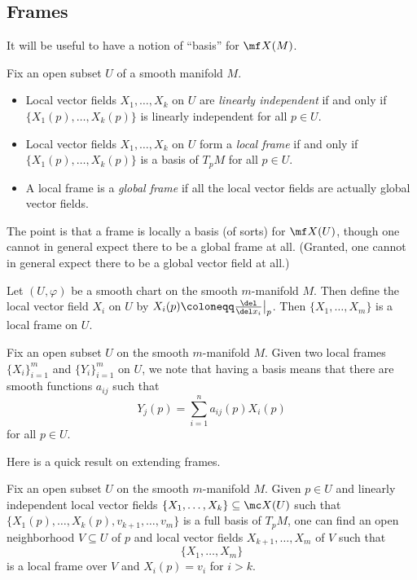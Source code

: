 \documentclass[../notes.tex]{subfiles}
\begin{document}
\subsection{Frames}
It will be useful to have a notion of ``basis'' for $\mf X(M)$.
\begin{definition}[frame]
	Fix an open subset $U$ of a smooth manifold $M$.
	\begin{itemize}
		\item Local vector fields $X_1,\ldots,X_k$ on $U$ are \textit{linearly independent} if and only if $\{X_1(p),\ldots,X_k(p)\}$ is linearly independent for all $p\in U$.
		\item Local vector fields $X_1,\ldots,X_k$ on $U$ form a \textit{local frame} if and only if $\{X_1(p),\ldots,X_k(p)\}$ is a basis of $T_pM$ for all $p\in U$.
		\item A local frame is a \textit{global frame} if all the local vector fields are actually global vector fields.
	\end{itemize}
\end{definition}
The point is that a frame is locally a basis (of sorts) for $\mf X(U)$, though one cannot in general expect there to be a global frame at all. (Granted, one cannot in general expect there to be a global vector field at all.)
\begin{example}
	Let $(U,\varphi)$ be a smooth chart on the smooth $m$-manifold $M$. Then define the local vector field $X_i$ on $U$ by $X_i(p)\coloneqq\frac{\del}{\del x_i}\big|_p$. Then $\{X_1,\ldots,X_m\}$ is a local frame on $U$.
\end{example}
\begin{remark}
	Fix an open subset $U$ on the smooth $m$-manifold $M$. Given two local frames $\{X_i\}_{i=1}^m$ and $\{Y_i\}_{i=1}^m$ on $U$, we note that having a basis means that there are smooth functions $a_{ij}$ such that
	\[Y_j(p)=\sum_{i=1}^na_{ij}(p)X_i(p)\]
	for all $p\in U$.
\end{remark}
Here is a quick result on extending frames.
\begin{proposition}
	Fix an open subset $U$ on the smooth $m$-manifold $M$. Given $p\in U$ and linearly independent local vector fields $\{X_1,\ldots,X_k\}\subseteq\mc X(U)$ such that $\{X_1(p),\ldots,X_k(p),v_{k+1},\ldots,v_m\}$ is a full basis of $T_pM$, one can find an open neighborhood $V\subseteq U$ of $p$ and local vector fields $X_{k+1},\ldots,X_m$ of $V$ such that
	\[\{X_1,\ldots,X_m\}\]
	is a local frame over $V$ and $X_i(p)=v_i$ for $i>k$.
\end{proposition}
\end{document}
